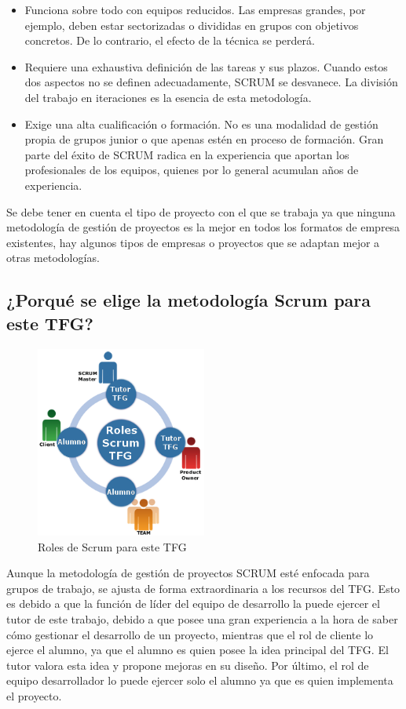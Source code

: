 \begin{itemize}
\item Funciona sobre todo con equipos reducidos. Las empresas grandes, por ejemplo, deben estar sectorizadas o divididas en grupos con objetivos concretos. De lo contrario, el efecto de la técnica se perderá.
\item Requiere una exhaustiva definición de las tareas y sus plazos. Cuando estos dos aspectos no se definen adecuadamente, SCRUM se desvanece. La división del trabajo en iteraciones es la esencia de esta metodología.
\item Exige una alta cualificación o formación. No es una modalidad de gestión propia de grupos junior o que apenas estén en proceso de formación. Gran parte del éxito de SCRUM radica en la experiencia que aportan los profesionales de los equipos, quienes por lo general acumulan años de experiencia.
\end{itemize}

Se debe tener en cuenta el tipo de proyecto con el que se trabaja ya que ninguna metodología  de gestión de proyectos es la mejor en todos los formatos de empresa existentes, hay algunos tipos de empresas o proyectos que se adaptan mejor a otras metodologías.

\subsection{¿Porqué se elige la metodología Scrum para este \acs{TFG}?}

\begin{figure}
	\centering
	\includegraphics[width=0.5\textwidth]{./figures/ScrumRoles.png}
	\caption{Roles de Scrum para este \acs{TFG}}
	\label{fig:ScrumRoles}
\end{figure}


Aunque la metodología de gestión de proyectos SCRUM esté enfocada para grupos de trabajo, se ajusta de forma extraordinaria a los recursos del \ac{TFG}. Esto es debido a que la función de líder del equipo de desarrollo la puede ejercer el tutor de este trabajo, debido a que posee una gran experiencia a la hora de saber cómo gestionar el desarrollo de un proyecto, mientras que el rol de cliente lo ejerce el alumno, ya que el alumno es quien posee la idea principal del \ac{TFG}. El tutor valora esta idea y propone mejoras en su diseño. Por último, el rol de equipo desarrollador lo puede ejercer solo el alumno ya que es quien implementa el proyecto.

